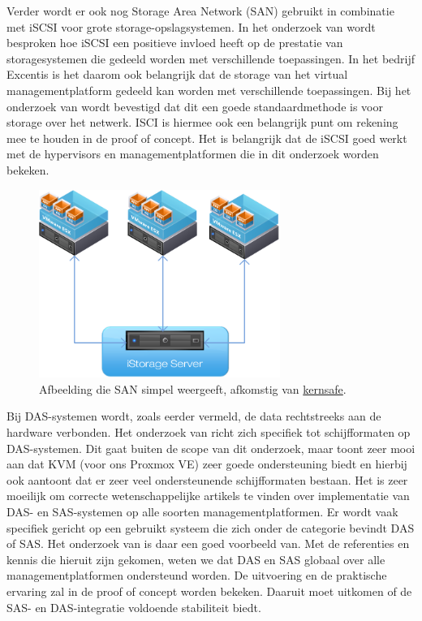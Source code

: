 \FloatBarrier
Verder wordt er ook nog Storage Area Network (SAN) gebruikt in combinatie met iSCSI voor grote storage-opslagsystemen. In het onderzoek van \textcite{park2024performance} wordt besproken hoe iSCSI een positieve invloed heeft op de prestatie van storagesystemen die gedeeld worden met verschillende toepassingen.
In het bedrijf Excentis is het daarom ook belangrijk dat de storage van het virtual managementplatform gedeeld kan worden met verschillende toepassingen. Bij het onderzoek van \textcite{park2024performance} wordt bevestigd dat dit een goede standaardmethode is voor storage over het netwerk.
ISCI is hiermee ook een belangrijk punt om rekening mee te houden in de proof of concept. Het is belangrijk dat de iSCSI goed werkt met de hypervisors en managementplatformen die in dit onderzoek worden bekeken.

\begin{figure}[h!]
  \centering
  \includegraphics[width=0.7\textwidth]{../onderzoek/nas-isci.png} 
  \caption{Afbeelding die SAN simpel weergeeft, afkomstig van \href{https://www.kernsafe.com/images/VMware-iSCSI-iStorage-Server.png}{kernsafe}.}
  \label{fig:san}
\end{figure}


\FloatBarrier
Bij DAS-systemen wordt, zoals eerder vermeld, de data rechtstreeks aan de hardware verbonden. Het onderzoek van \textcite{joshi2014empirical} richt zich specifiek tot schijfformaten op DAS-systemen.
Dit gaat buiten de scope van dit onderzoek, maar toont zeer mooi aan dat KVM (voor ons Proxmox VE) zeer goede ondersteuning biedt en hierbij ook aantoont dat er zeer veel ondersteunende schijfformaten bestaan.
Het is zeer moeilijk om correcte wetenschappelijke artikels te vinden over implementatie van DAS- en SAS-systemen op alle soorten managementplatformen. Er wordt vaak specifiek gericht op een gebruikt systeem die zich onder de categorie bevindt DAS of SAS. Het onderzoek van \textcite{joshi2014empirical} is daar een goed voorbeeld van.
Met de referenties en kennis die hieruit zijn gekomen, weten we dat DAS en SAS globaal over alle managementplatformen ondersteund worden. De uitvoering en de praktische ervaring zal in de proof of concept worden bekeken. Daaruit moet uitkomen of de SAS- en DAS-integratie voldoende stabiliteit biedt.


